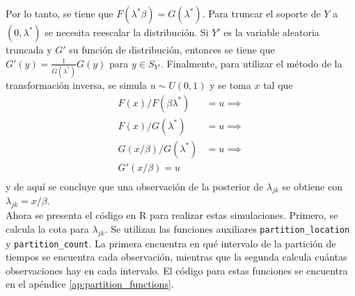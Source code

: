 \documentclass[11pt,a4paper]{article}
\begin{document}
Por lo tanto, se tiene que $F(\lambda^* \beta) = G(\lambda^*)$. Para truncar el soporte de $Y$ a $(0, \lambda^*)$ se necesita reescalar la distribución. Si $Y'$ es la variable aleatoria truncada y $G'$ su función de distribución, entonces se tiene que $G'(y) = \frac{1}{G(\lambda^*)} G(y)$ para $y \in S_{Y'}$. Finalmente, para utilizar el método de la transformación inversa, se simula $u\sim U(0, 1)$ y se toma $x$ tal que
\begin{align*}
F(x) / F(\beta \lambda^*) &= u \implies\\
F(x) / G(\lambda^*) &= u \implies\\
G(x/\beta) / G(\lambda^*) &= u \implies\\
G'(x/\beta) = u\\
\end{align*}
y de aquí se concluye que una observación de la posterior de $\lambda_{jk}$ se obtiene con $\lambda_{jk} = x/\beta$.\\

Ahora se presenta el código en R para realizar estas simulaciones. Primero, se calcula la cota para $\lambda_{jk}$. Se utilizan las funciones auxiliares \texttt{partition\_location} y \texttt{partition\_count}. La primera encuentra en qué intervalo de la partición de tiempos se encuentra cada observación, mientras que la segunda calcula cuántas observaciones hay en cada intervalo. El código para estas funciones se encuentra en el apéndice \ref{ap:partition_functions}.\\

\newpage
\end{document}
